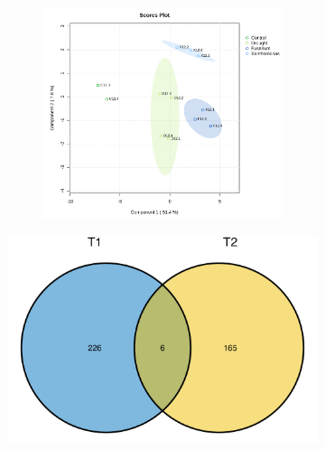 \begin{figure}[!hptb]
\begin{subfigure}[b]{0.42\textwidth}
   \caption{}
   \label{fig:Sig171FeaturesRedSamples}
  \end{subfigure}
  \hfill
  \begin{minipage}[b]{0.57\textwidth}
   \begin{subfigure}[b]{\linewidth}
   \begin{subfigure}[b]{\linewidth}
	  \includegraphics[width=\textwidth]{Figures/PLSDA_SigFeaturesRedSamplesRedGroupsSecondTimePoint.pdf}
    \caption{}
    \label{fig:FeaturesTimePoint_plsda}
   \end{subfigure}
	  \includegraphics[width=\textwidth]{Figures/SharedFeaturesVenn_Time.png}
    \caption{}
    \label{fig:FeaturesTimePoint_Venn}

\end{subfigure}
\end{minipage}
\end{figure}
